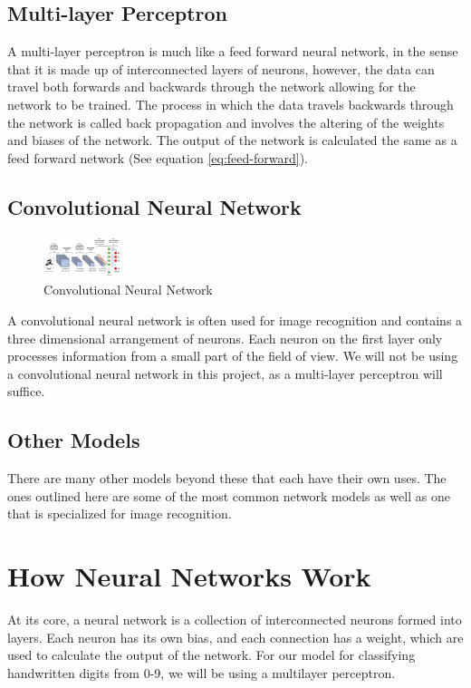 \documentclass[a1,portrait]{a1poster}
\begin{document}
\begin{multicols}{2}
\subsection*{Multi-layer Perceptron}
A multi-layer perceptron is much like a feed forward neural network, in the sense that it is made up of interconnected layers of neurons, however, the data can travel both forwards and backwards through the network allowing for the network to be trained. The process in which the data travels backwards through the network is called back propagation and involves the altering of the weights and biases of the network. The output of the network is calculated the same as a feed forward network (See equation \ref{eq:feed-forward}).

\subsection*{Convolutional Neural Network}
\begin{figure}
    \centering
    \includegraphics[width=0.2\textwidth]{assets/convolutional2.jpeg}
    \caption{Convolutional Neural Network}
    \label{fig:convolutional}
\end{figure}
A convolutional neural network is often used for image recognition and contains a three dimensional arrangement of neurons. Each neuron on the first layer only processes information from a small part of the field of view. We will not be using a convolutional neural network in this project, as a multi-layer perceptron will suffice.
\subsection*{Other Models}
There are many other models beyond these that each have their own uses. The ones outlined here are some of the most common network models as well as one that is specialized for image recognition.

\section*{How Neural Networks Work}
At its core, a neural network is a collection of interconnected neurons formed into layers. Each neuron has its own bias, and each connection has a weight, which are used to calculate the output of the network. For our model for classifying handwritten digits from 0-9, we will be using a multilayer perceptron. 

\end{multicols}
\end{document}
